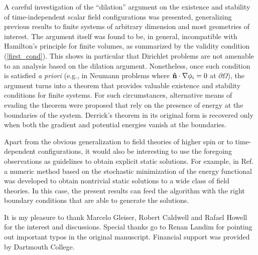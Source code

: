 \documentclass[a4paper,prd,twocolumn,showpacs,amsmath]{revtex4}
\newcommand{\vecn}{{\bf \hat n}}
\newcommand{\domega}{\partial \Omega}
\begin{document}
A careful investigation of the ``dilation'' argument on the existence and stability of
time-independent scalar field configurations was presented, generalizing previous results to finite
systems of arbitrary dimension and most geometries of interest. The argument itself was found to be,
in general, incompatible with
Hamilton's principle for finite volumes, as summarized by the validity condition (\ref{first_cond}).
This shows in particular that Dirichlet problems are not amenable to an analysis based on the dilation
argument.
Nonetheless, once such condition is satisfied {\em a priori} (e.g., in Neumann problems
where $\vecn\cdot\nabla\phi_i=0$ at $\domega$), the argument
turns into a theorem that provides valuable existence and stability conditions for finite systems.
For such circumstances, alternative means of evading the theorem were proposed that rely on the presence of
energy at the boundaries of the system. Derrick's theorem in its original form is recovered only when
both the gradient and potential energies vanish at the boundaries.

Apart from the obvious generalization to field theories of higher spin or to time-dependent
configurations, it would also be interesting to use the foregoing observations as guidelines to obtain
explicit static solutions. For example, in Ref. \cite{hale} a numeric method based on the stochastic
minimization of the energy functional was developed to obtain nontrivial static solutions to a wide
class of field theories. In this case, the present results can feed the algorithm with the right
boundary conditions that are able to generate the solutions.

\acknowledgments

It is my pleasure to thank Marcelo Gleiser, Robert Caldwell and Rafael Howell for the
interest and discussions. Special thanks go to Renan Landim for pointing out important typos in
the original manuscript. Financial support was provided by Dartmouth College.

\appendix
\end{document}
